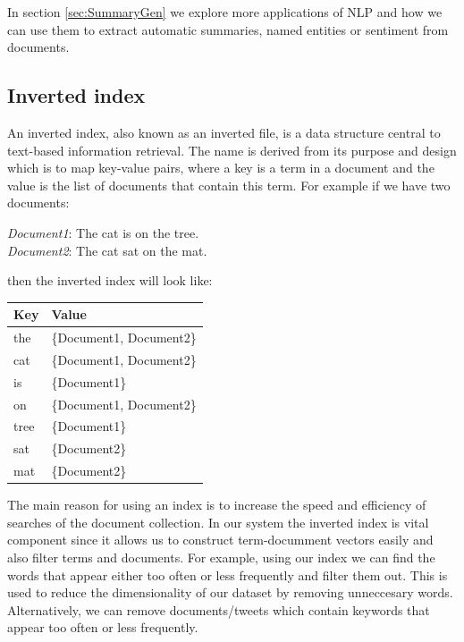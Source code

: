 In section \ref{sec:SummaryGen} we explore more applications of NLP and how we can use them to extract automatic summaries, named entities or sentiment from documents.

\subsection{Inverted index}
An inverted index, also known as an inverted file, is a data structure central to text-based information retrieval. The name is derived from its 
purpose and design which is to map key-value pairs, where a key is a term in a document and the value is the list of documents that contain this term.
For example if we have two documents:\\
\begin{center}
\emph{Document1}: The cat is on the tree. \\
\emph{Document2}: The cat sat on the mat. \\
\end{center}
then the inverted index will look like:

\begin{center}
\begin{tabular}{ |l | l| }
  \hline
  \textbf{Key} & \textbf{Value} \\ \hline
  the & \{Document1, Document2\} \\
  cat & \{Document1, Document2\} \\
  is & \{Document1\} \\
  on & \{Document1, Document2\} \\
  tree & \{Document1\} \\
  sat & \{Document2\} \\
  mat & \{Document2\} \\
  \hline
\end{tabular}
\end{center}

The main reason for using an index is to increase the speed and efficiency of searches of the document 
collection. In our system the inverted index is vital component since it allows us to construct
term-documment vectors easily and also filter terms and documents. For example, using our index we
can find the words that appear either too often or less frequently and filter them out. This is used
to reduce the dimensionality of our dataset by removing unneccesary words. Alternatively, we
can remove documents/tweets which contain keywords that appear too often or less frequently.

